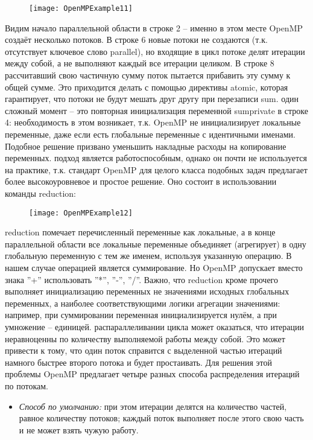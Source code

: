 {	\begin{figure}[H]
		\texttt{[image: OpenMPExample11]}
	\end{figure}
	Видим начало параллельной области в строке 2 – именно в этом месте OpenMP создаёт несколько потоков. В строке 6 новые потоки не создаются (т.к. отсутствует ключевое слово parallel), но входящие в цикл потоке делят итерации между собой, а не выполняют каждый все итерации целиком. В строке 8 рассчитавший свою частичную сумму поток пытается прибавить эту сумму к общей сумме. Это приходится делать с помощью директивы atomic, которая гарантирует, что потоки не будут мешать друг другу при перезаписи sum. 
	 один сложный момент – это повторная инициализация переменной sum\textunderscore private в строке 4: необходимость в этом возникает, т.к. OpenMP не инициализирует локальные переменные, даже если есть глобальные переменные с идентичными именами. Подобное решение призвано уменьшить накладные расходы на копирование переменных.
	 подход является работоспособным, однако он почти не используется на практике, т.к. стандарт OpenMP для целого класса подобных задач предлагает более высокоуровневое и простое решение. Оно состоит в использовании команды reduction:
	\begin{figure}[H]
		\texttt{[image: OpenMPExample12]}
	\end{figure}
	 reduction помечает перечисленный переменные как локальные, а в конце параллельной области все локальные переменные объединяет (агрегирует) в одну глобальную переменную с тем же именем, используя указанную операцию. В нашем случае операцией является суммирование. Но OpenMP допускает вместо знака ''+'' использовать ''*'', ''-'', ''/''. Важно, что reduction кроме прочего выполняет инициализацию переменных не значениями исходных глобальных переменных, а наиболее соответствующими логики агрегации значениями: например, при суммировании переменная инициализируется нулём, а при умножение – единицей.
	 распараллеливании цикла может оказаться, что итерации неравноценны по количеству выполняемой работы между собой. Это может привести к тому, что один поток справится с выделенной частью итераций намного быстрее второго потока и будет простаивать. Для решения этой проблемы OpenMP предлагает четыре разных способа распределения итераций по потокам. 
	\begin{itemize}
		\item\textit{Способ по умолчанию:} при этом итерации делятся на количество частей, равное количеству потоков; каждый поток выполняет после этого свою часть и не может взять чужую работу.

\end{itemize}}

